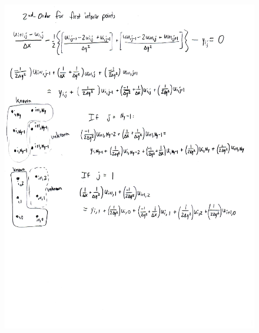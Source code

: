 \documentclass[10pt]{article}
\begin{document}
\pagebreak
\begin{figure}[H]
	\begin{center}
		\includegraphics[width=16cm]{app3_p3.jpg}
	\end{center}
\end{figure}
\end{document}
